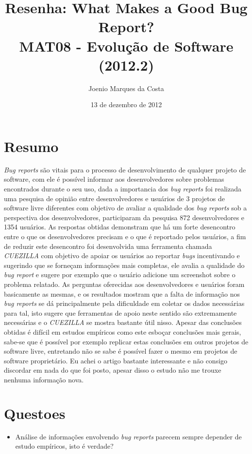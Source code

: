\documentclass[12pt]{article}
\title{Resenha: What Makes a Good Bug Report?\cite{GoodBugReport} \\
 \large MAT08 - Evolução de Software (2012.2)}
\author{Joenio Marques da Costa}
\date{13 de dezembro de 2012}
\begin{document}
\maketitle

\section*{Resumo}

{\it Bug reports} são vitais para o processo de desenvolvimento de qualquer
projeto de software, com ele é possível informar aos desenvolvedores sobre
problemas encontrados durante o seu uso, dada a importancia dos {\it bug
reports} foi realizada uma pesquisa de opinião entre desenvolvedores e usuários
de 3 projetos de software livre diferentes com objetivo de avaliar a qualidade
dos {\it bug reports} sob a perspectiva dos desenvolvedores, participaram da
pesquisa 872 desenvolvedores e 1354 usuários. As respostas obtidas demonstram
que há um forte desencontro entre o que os desenvolvedores precisam e o que é
reportado pelos usuários, a fim de reduzir este desencontro foi desenvolvida
uma ferramenta chamada {\it CUEZILLA} com objetivo de apoiar os usuários ao
reportar {\it bugs} incentivando e sugerindo que se forneçam informações mais
completas, ele avalia a qualidade do {\it bug report} e sugere por exemplo que
o usuário adicione um screenshot sobre o problema relatado. As perguntas
oferecidas aos desenvolvedores e usuários foram basicamente as mesmas, e os
resultados mostram que a falta de informação nos {\it bug reports} se dá
principalmente pela dificuldade em coletar os dados necessárias para tal, isto
sugere que ferramentas de apoio neste sentido são extremamente necessárias e o
{\it CUEZILLA} se mostra bastante útil nisso. Apesar das conclusões obtidas é
difícil em estudos empíricos como este esboçar conclusões mais gerais, sabe-se
que é possível por exemplo replicar estas conclusões em outros projetos de
software livre, entretando não se sabe é possível fazer o mesmo em projetos de
software proprietário. Eu achei o artigo bastante interessante e não consigo
discordar em nada do que foi posto, apesar disso o estudo não me trouxe nenhuma
informação nova.

\section*{Questoes}

\begin{itemize}
  \item Análise de informações envolvendo {\it bug reports} parecem sempre
    depender de estudo empíricos, isto é verdade?
\end{itemize}


\end{document}
